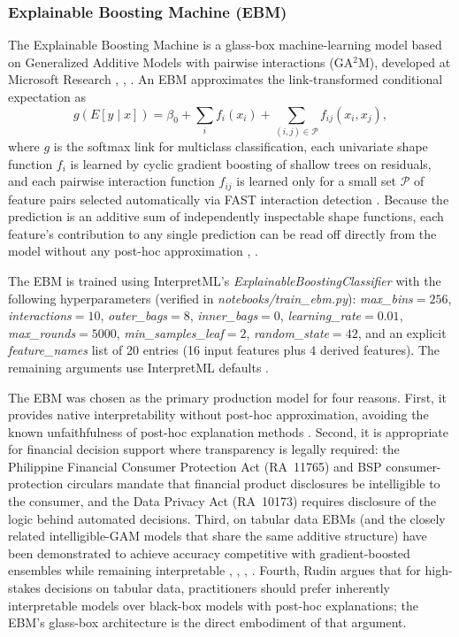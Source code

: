\documentclass{icsthesis}
\begin{document}
\begin{mainmatter}
				\subsubsection{Explainable Boosting Machine (EBM)}
					The Explainable Boosting Machine is a glass-box machine-learning model based on Generalized Additive Models with pairwise interactions (GA$^2$M), developed at Microsoft Research \cite{ref48}, \cite{ref49}, \cite{ref15}. An EBM approximates the link-transformed conditional expectation as
					\begin{equation*}
					    g(E[y \mid x]) = \beta_0 + \sum_{i} f_i(x_i) + \sum_{(i,j) \in \mathcal{P}} f_{ij}(x_i, x_j),
					\end{equation*}
					where $g$ is the softmax link for multiclass classification, each univariate shape function $f_i$ is learned by cyclic gradient boosting of shallow trees on residuals, and each pairwise interaction function $f_{ij}$ is learned only for a small set $\mathcal{P}$ of feature pairs selected automatically via FAST interaction detection \cite{ref49}. Because the prediction is an additive sum of independently inspectable shape functions, each feature's contribution to any single prediction can be read off directly from the model without any post-hoc approximation \cite{ref50}, \cite{ref15}.

					The EBM is trained using InterpretML's \emph{ExplainableBoostingClassifier} with the following hyperparameters (verified in \emph{notebooks/train\_ebm.py}): \emph{max\_bins}$=256$, \emph{interactions}$=10$, \emph{outer\_bags}$=8$, \emph{inner\_bags}$=0$, \emph{learning\_rate}$=0.01$, \emph{max\_rounds}$=5000$, \emph{min\_samples\_leaf}$=2$, \emph{random\_state}$=42$, and an explicit \emph{feature\_names} list of 20 entries (16 input features plus 4 derived features). The remaining arguments use InterpretML defaults \cite{ref15}.

					The EBM was chosen as the primary production model for four reasons. First, it provides native interpretability without post-hoc approximation, avoiding the known unfaithfulness of post-hoc explanation methods \cite{ref51}. Second, it is appropriate for financial decision support where transparency is legally required: the Philippine Financial Consumer Protection Act (RA~11765) \cite{ref44} and BSP consumer-protection circulars mandate that financial product disclosures be intelligible to the consumer, and the Data Privacy Act (RA~10173) \cite{ref45} requires disclosure of the logic behind automated decisions. Third, on tabular data EBMs (and the closely related intelligible-GAM models that share the same additive structure) have been demonstrated to achieve accuracy competitive with gradient-boosted ensembles while remaining interpretable \cite{ref15}, \cite{ref48}, \cite{ref49}, \cite{ref50}. Fourth, Rudin \cite{ref51} argues that for high-stakes decisions on tabular data, practitioners should prefer inherently interpretable models over black-box models with post-hoc explanations; the EBM's glass-box architecture is the direct embodiment of that argument.


\end{mainmatter}
\end{document}
